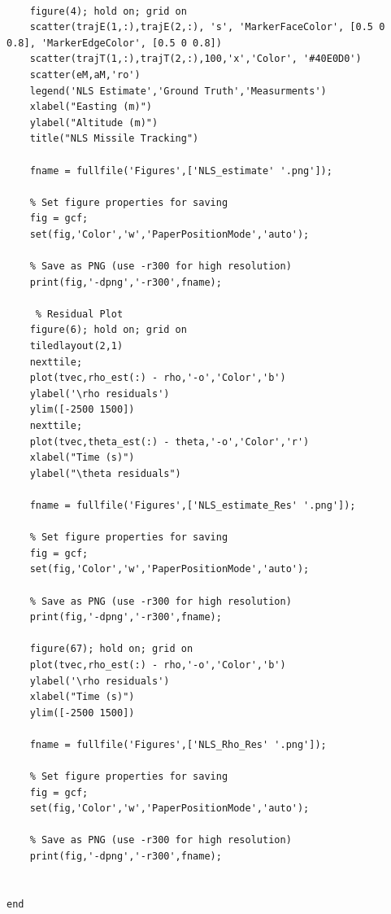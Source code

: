 \documentclass[11pt]{article}
\begin{document}
\begin{lstlisting}[style=matlab]
    
    figure(4); hold on; grid on
    scatter(trajE(1,:),trajE(2,:), 's', 'MarkerFaceColor', [0.5 0 0.8], 'MarkerEdgeColor', [0.5 0 0.8])
    scatter(trajT(1,:),trajT(2,:),100,'x','Color', '#40E0D0')
    scatter(eM,aM,'ro')
    legend('NLS Estimate','Ground Truth','Measurments')
    xlabel("Easting (m)")
    ylabel("Altitude (m)")
    title("NLS Missile Tracking")

    fname = fullfile('Figures',['NLS_estimate' '.png']);

    % Set figure properties for saving
    fig = gcf;
    set(fig,'Color','w','PaperPositionMode','auto');
    
    % Save as PNG (use -r300 for high resolution)
    print(fig,'-dpng','-r300',fname);

     % Residual Plot
    figure(6); hold on; grid on
    tiledlayout(2,1)
    nexttile;
    plot(tvec,rho_est(:) - rho,'-o','Color','b')
    ylabel('\rho residuals')
    ylim([-2500 1500])
    nexttile;
    plot(tvec,theta_est(:) - theta,'-o','Color','r')
    xlabel("Time (s)")
    ylabel("\theta residuals")

    fname = fullfile('Figures',['NLS_estimate_Res' '.png']);

    % Set figure properties for saving
    fig = gcf;
    set(fig,'Color','w','PaperPositionMode','auto');
    
    % Save as PNG (use -r300 for high resolution)
    print(fig,'-dpng','-r300',fname);

    figure(67); hold on; grid on
    plot(tvec,rho_est(:) - rho,'-o','Color','b')
    ylabel('\rho residuals')
    xlabel("Time (s)")
    ylim([-2500 1500])

    fname = fullfile('Figures',['NLS_Rho_Res' '.png']);

    % Set figure properties for saving
    fig = gcf;
    set(fig,'Color','w','PaperPositionMode','auto');
    
    % Save as PNG (use -r300 for high resolution)
    print(fig,'-dpng','-r300',fname);
    

end

\end{lstlisting}
\end{document}
